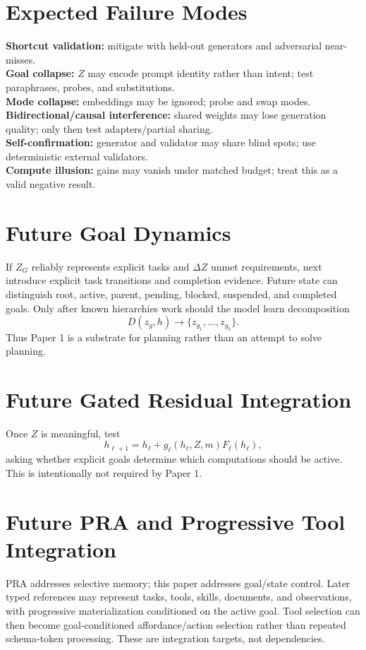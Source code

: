 \documentclass[11pt]{article}
\begin{document}
\section{Expected Failure Modes}
\textbf{Shortcut validation:} mitigate with held-out generators and adversarial near-misses.\\
\textbf{Goal collapse:} $Z$ may encode prompt identity rather than intent; test paraphrases, probes, and substitutions.\\
\textbf{Mode collapse:} embeddings may be ignored; probe and swap modes.\\
\textbf{Bidirectional/causal interference:} shared weights may lose generation quality; only then test adapters/partial sharing.\\
\textbf{Self-confirmation:} generator and validator may share blind spots; use deterministic external validators.\\
\textbf{Compute illusion:} gains may vanish under matched budget; treat this as a valid negative result.

\section{Future Goal Dynamics}
If $Z_G$ reliably represents explicit tasks and $\Delta Z$ unmet requirements, next introduce explicit task transitions and completion evidence. Future state can distinguish root, active, parent, pending, blocked, suspended, and completed goals. Only after known hierarchies work should the model learn decomposition
\begin{equation}
D(z_g,h)\rightarrow\{z_{g_1},\ldots,z_{g_k}\}.
\end{equation}
Thus Paper 1 is a substrate for planning rather than an attempt to solve planning.

\section{Future Gated Residual Integration}
Once $Z$ is meaningful, test
\begin{equation}
h_{\ell+1}=h_\ell+g_\ell(h_\ell,Z,m)F_\ell(h_\ell),
\end{equation}
asking whether explicit goals determine which computations should be active. This is intentionally not required by Paper 1.

\section{Future PRA and Progressive Tool Integration}
PRA addresses selective memory; this paper addresses goal/state control. Later typed references may represent tasks, tools, skills, documents, and observations, with progressive materialization conditioned on the active goal. Tool selection can then become goal-conditioned affordance/action selection rather than repeated schema-token processing. These are integration targets, not dependencies.
\end{document}
